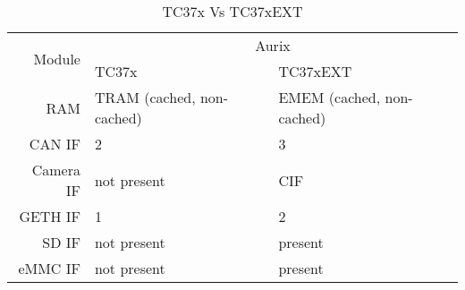 
\begin{table}[htbp]
  \centering
    \begin{tabular}{|r||l|l|}
	\hline
	\multirow{2}{*}{Module} & \multicolumn{2}{c|}{Aurix}\\
	\cline{2-3}
	& TC37x & TC37xEXT \\
	\hline \hline
	    RAM & TRAM (cached, non-cached) & EMEM (cached, non-cached) \\
	    \hline
	    CAN IF & 2 & 3 \\
	    \hline
	    Camera IF & not present & CIF \\
	    \hline
	    GETH IF & 1 & 2 \\
	    \hline
	    SD IF & not present & present \\
	    \hline
	    eMMC IF & not present & present \\
	    \hline
	\hline
    \end{tabular}
  \caption{TC37x Vs TC37xEXT}
  \label{tab:tc37x_delta}
\end{table}
